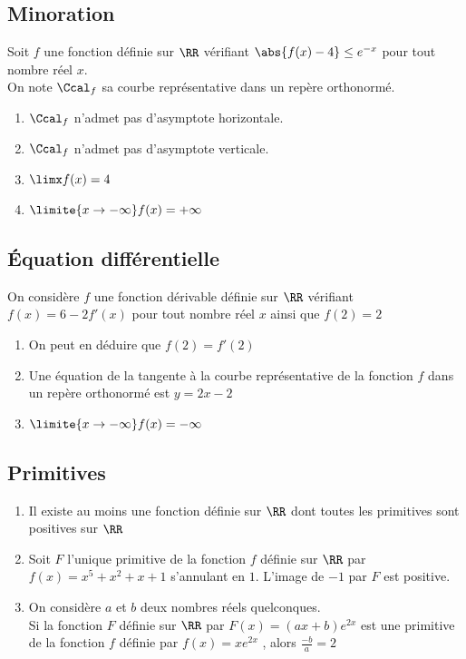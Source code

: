 \documentclass[oneside,12pt]{article}
\begin{document}
\subsection{Minoration}
Soit $f$ une fonction définie sur $\RR$ vérifiant $\abs{f(x)-4}\leq e^{-x}$ pour tout nombre réel $x$.\\
On note $\Ccal_f$ sa courbe représentative dans un repère orthonormé.
\begin{enumerate}
	\item $\Ccal_f$ n'admet pas d'asymptote horizontale.
	\item $\Ccal_f$ n'admet pas d'asymptote verticale.
	\item $\limx f(x)=4$
	\item $\limite{x\to-\infty} f(x)=+\infty$	
\end{enumerate}



\subsection{Équation différentielle}
On considère $f$ une fonction dérivable définie sur $\RR$ vérifiant $f(x)=6-2f'(x)$ pour tout nombre réel $x$ ainsi que $f(2)=2$
\begin{enumerate}
    \item On peut en déduire que $f(2)=f'(2)$
    \item Une équation de la tangente à la courbe représentative de la fonction $f$ dans un repère orthonormé est $y=2x-2$
    \item  $\limite{x\to-\infty} f(x)=-\infty$
\end{enumerate}



\subsection{Primitives}
\begin{enumerate}
	\item Il existe au moins une fonction définie sur $\RR$ dont toutes les primitives sont positives sur $\RR$
	\item Soit $F$ l'unique primitive de la fonction $f$ définie sur $\RR$ par $f(x) = x^5+x^2+x+1$ s'annulant en $1$. L'image de $-1$ par $F$ est positive.
	\item On considère $a$ et $b$ deux nombres réels quelconques.\\
	Si la fonction $F$ définie sur $\RR$ par $F(x) = (ax+b)e^{2x}$ est une primitive de la fonction $f$ définie par $f(x) = xe^{2x}$ , alors $\frac{-b}{a}=2$
\end{enumerate}
\end{document}
